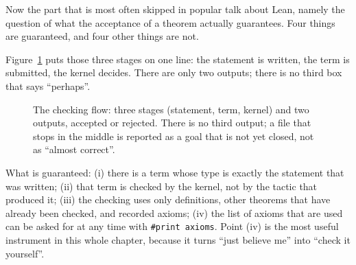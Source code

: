Now the part that is most often skipped in popular talk about Lean, namely the question of what the
acceptance of a theorem actually guarantees. Four things are guaranteed, and four other things are
not.

Figure~\ref{fig:alur-periksa} puts those three stages on one line: the statement is written, the
term is submitted, the kernel decides. There are only two outputs; there is no third box that says
``perhaps''.

\begin{figure}[htbp]
\centering
{}
\caption{The checking flow: three stages (statement, term, kernel) and two outputs, accepted or
rejected. There is no third output; a file that stops in the middle is reported as a goal that is
not yet closed, not as ``almost correct''.}
\label{fig:alur-periksa}
\end{figure}

What is guaranteed: (i) there is a term whose type is exactly the statement that was written; (ii)
that term is checked by the kernel, not by the tactic that produced it; (iii) the checking uses only
definitions, other theorems that have already been checked, and recorded axioms; (iv) the list of
axioms that are used can be asked for at any time with \texttt{\#print axioms}. Point (iv) is the
most useful instrument in this whole chapter, because it turns ``just believe me'' into ``check it
yourself''.

